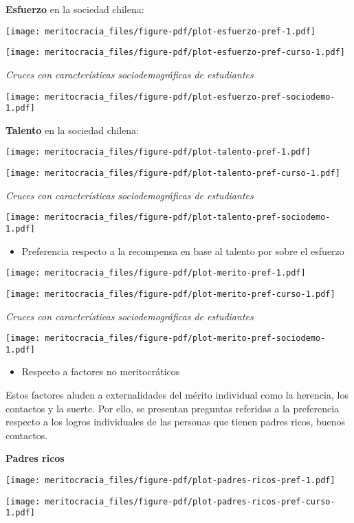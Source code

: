 \documentclass[
  letterpaper,
  DIV=11,
  numbers=noendperiod]{scrreprt}
\providecommand{\tightlist}{%
  \setlength{\itemsep}{0pt}\setlength{\parskip}{0pt}}\usepackage{longtable,booktabs,array}
\begin{document}
\textbf{Esfuerzo} en la sociedad chilena:

\texttt{[image: meritocracia\_files/figure-pdf/plot-esfuerzo-pref-1.pdf]}

\texttt{[image: meritocracia\_files/figure-pdf/plot-esfuerzo-pref-curso-1.pdf]}

\emph{Cruces con características sociodemográficas de estudiantes}

\texttt{[image: meritocracia\_files/figure-pdf/plot-esfuerzo-pref-sociodemo-1.pdf]}

\textbf{Talento} en la sociedad chilena:

\texttt{[image: meritocracia\_files/figure-pdf/plot-talento-pref-1.pdf]}

\texttt{[image: meritocracia\_files/figure-pdf/plot-talento-pref-curso-1.pdf]}

\emph{Cruces con características sociodemográficas de estudiantes}

\texttt{[image: meritocracia\_files/figure-pdf/plot-talento-pref-sociodemo-1.pdf]}

\begin{itemize}
\tightlist
\item
  Preferencia respecto a la recompensa en base al talento por sobre el
  esfuerzo
\end{itemize}

\texttt{[image: meritocracia\_files/figure-pdf/plot-merito-pref-1.pdf]}

\texttt{[image: meritocracia\_files/figure-pdf/plot-merito-pref-curso-1.pdf]}

\emph{Cruces con características sociodemográficas de estudiantes}

\texttt{[image: meritocracia\_files/figure-pdf/plot-merito-pref-sociodemo-1.pdf]}

\begin{itemize}
\tightlist
\item
  Respecto a factores no meritocráticos
\end{itemize}

Estos factores aluden a externalidades del mérito individual como la
herencia, los contactos y la suerte. Por ello, se presentan preguntas
referidas a la preferencia respecto a los logros individuales de las
personas que tienen padres ricos, buenos contactos.

\textbf{Padres ricos}

\texttt{[image: meritocracia\_files/figure-pdf/plot-padres-ricos-pref-1.pdf]}

\texttt{[image: meritocracia\_files/figure-pdf/plot-padres-ricos-pref-curso-1.pdf]}
\end{document}
